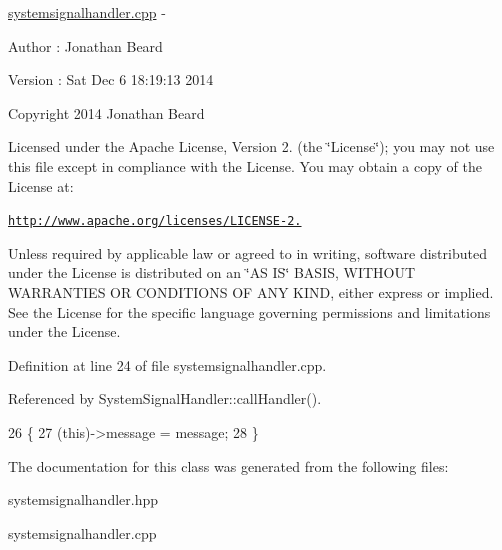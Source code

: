 \hyperlink{systemsignalhandler_8cpp_source}{systemsignalhandler.\+cpp} -\/ \begin{DoxyAuthor}{Author}
\+: Jonathan Beard 
\end{DoxyAuthor}
\begin{DoxyVersion}{Version}
\+: Sat Dec 6 18\+:19\+:13 2014
\end{DoxyVersion}
Copyright 2014 Jonathan Beard

Licensed under the Apache License, Version 2. (the \char`\"{}\+License\char`\"{}); you may not use this file except in compliance with the License. You may obtain a copy of the License at\+:

\href{http://www.apache.org/licenses/LICENSE-2.0}{\tt http\+://www.\+apache.\+org/licenses/\+L\+I\+C\+E\+N\+S\+E-\/2.}

Unless required by applicable law or agreed to in writing, software distributed under the License is distributed on an \char`\"{}\+A\+S I\+S\char`\"{} B\+A\+S\+IS, W\+I\+T\+H\+O\+UT W\+A\+R\+R\+A\+N\+T\+I\+ES OR C\+O\+N\+D\+I\+T\+I\+O\+NS OF A\+NY K\+I\+ND, either express or implied. See the License for the specific language governing permissions and limitations under the License. 

Definition at line 24 of file systemsignalhandler.\+cpp.



Referenced by System\+Signal\+Handler\+::call\+Handler().


\begin{DoxyCode}
26 \{
27    (\textcolor{keyword}{this})->message = message;
28 \}
\end{DoxyCode}


The documentation for this class was generated from the following files\+:\begin{DoxyCompactItemize}
\item 
systemsignalhandler.\+hpp\item 
systemsignalhandler.\+cpp\end{DoxyCompactItemize}
